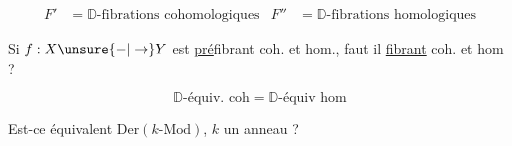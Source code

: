 

\[\begin{aligned}F'&=\mathbb D\text{-fibrations cohomologiques}& F''&=\mathbb D\text{-fibrations homologiques}\end{aligned}\]

Si $f:X\unsure{\mathord{-}|\to}Y$ est \uline{pré}fibrant coh. et hom.,  faut il \uline{fibrant} coh. et hom ?

\[\mathbb D\text{-équiv. coh}=\mathbb D\text{-équiv hom}\]


Est-ce équivalent  $\mathrm{Der}(k\text{-}\mathrm{Mod})$, $k$ un anneau ?
